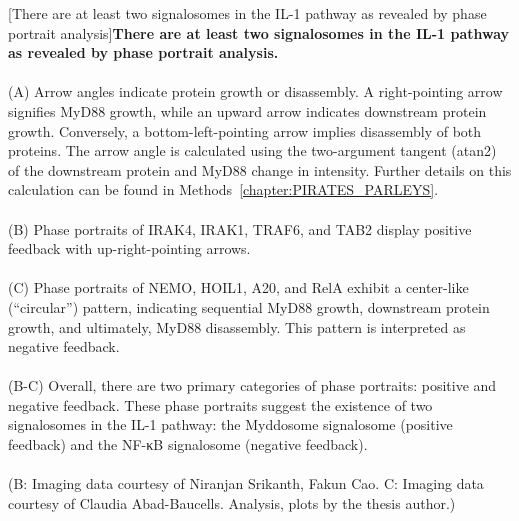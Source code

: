 \begin{centering}

\captionsetup{parbox=none}
[There are at least two signalosomes in the IL-1 pathway as revealed by phase portrait analysis]{\textbf{There are at least two signalosomes in the IL-1 pathway as revealed by phase portrait analysis.} 
\\
\\
(A) Arrow angles indicate protein growth or disassembly. A right-pointing arrow signifies MyD88 growth, while an upward arrow indicates downstream protein growth. Conversely, a bottom-left-pointing arrow implies disassembly of both proteins. The arrow angle is calculated using the two-argument tangent (atan2) of the downstream protein and MyD88 change in intensity. Further details on this calculation can be found in Methods~\ref{chapter:PIRATES_PARLEYS}.
\\
\\
(B) Phase portraits of IRAK4, IRAK1, TRAF6, and TAB2 display positive feedback with up-right-pointing arrows.
\\
\\
(C) Phase portraits of NEMO, HOIL1, A20, and RelA exhibit a center-like (“circular”) pattern, indicating sequential MyD88 growth, downstream protein growth, and ultimately, MyD88 disassembly. This pattern is interpreted as negative feedback.
\\
\\
(B-C) Overall, there are two primary categories of phase portraits: positive and negative feedback. These phase portraits suggest the existence of two signalosomes in the IL-1 pathway: the Myddosome signalosome (positive feedback) and the NF-κB signalosome (negative feedback).
\\
\\
(B: Imaging data courtesy of Niranjan Srikanth, Fakun Cao. C: Imaging data courtesy of Claudia Abad-Baucells. Analysis, plots by the thesis author.)}
\label{p2:3}
\end{centering}

